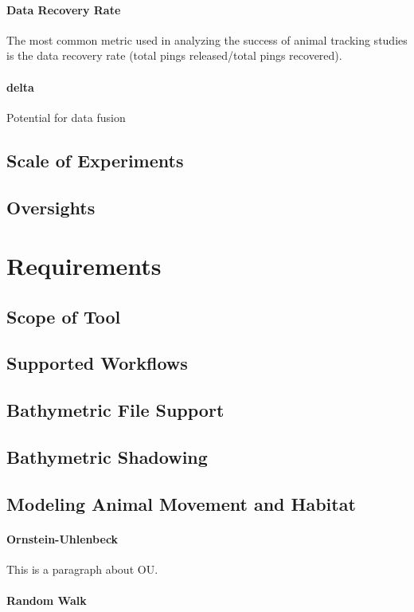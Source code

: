 \paragraph{Data Recovery Rate}
The most common metric used in analyzing the success of animal tracking studies is the data recovery rate (total pings released/total pings recovered).    

\paragraph{delta}
Potential for data fusion

\subsection{Scale of Experiments}

\subsection{Oversights}

\section{Requirements}
\subsection{Scope of Tool}
\subsection{Supported Workflows}
\subsection{Bathymetric File Support}
\subsection{Bathymetric Shadowing}
\subsection{Modeling Animal Movement and Habitat}
\paragraph{Ornstein-Uhlenbeck}
This is a paragraph about OU.
\paragraph{Random Walk}
